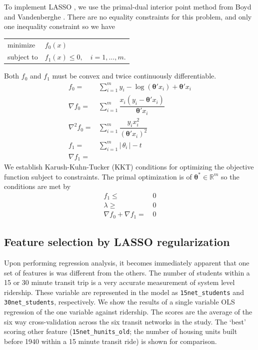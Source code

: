 \documentclass[11pt]{article}
\begin{document}
To implement LASSO \cite{Tibshirani1996}, we use the primal-dual interior point method from Boyd and Vandenberghe \cite{Boyd2004}. There are no equality constraints for this problem, and only one inequality constraint so we have

\begin{center}\begin{tabular}{ll}
minimize &$f_0(x)$\\
subject to &$f_1(x) \leq 0, \quad i = 1, ..., m$.
\end{tabular}\end{center}

Both $f_0$ and $f_1$ must be convex and twice continuously differentiable. 
\begin{align*}
f_0 =& \sum_{i=1}^m y_i-\log{\left(\boldsymbol{\theta}'x_i\right)} +\boldsymbol{\theta}'x_i \\
\nabla f_0 =& \sum_{i=1}^m \dfrac{x_i\left(y_i-\boldsymbol{\theta}'x_i\right)}{\boldsymbol{\theta}'x_i}\\
\nabla^2 f_0 =& \sum_{i=1}^m\dfrac{y_i x_i^2}{\left(\boldsymbol{\theta}'x_i\right)^2}\\[0.2in]
f_1 =& \sum_{i=1}^m |\,\theta_i\,| - t \\
\nabla f_1 =& 
\end{align*}
We establish Karush-Kuhn-Tucker (KKT) conditions for optimizing the objective function subject to constraints.
The primal optimization is of $\boldsymbol{\theta}^* \in \mathbb{R}^m$
 so the conditions are met by 
\begin{align*}
f_1 \leq& \,0\\
\lambda \geq& \,0\\
\nabla f_0 + \nabla f_1 =& \,0
\end{align*}



\subsection{Feature selection by LASSO regularization}

Upon performing regression analysis, it becomes immediately apparent that one set of features is was different from the others. The number of students within a 15 or 30 minute transit trip is a very accurate measurement of system level ridership. These variable are represented in the model as \texttt{15net\_students} and \texttt{30net\_students}, respectively. We show the results of a single variable OLS regression of the one variable against ridership. The scores are the average of the six way cross-validation across the six transit networks in the study. The `best' scoring other feature (\texttt{15net\_hunits\_old}; the number of housing units built before 1940 within a 15 minute transit ride) is shown for comparison.
\end{document}
